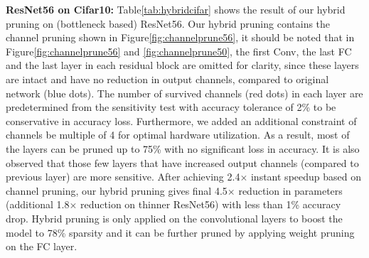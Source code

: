 \documentclass{article}
\begin{document}
\textbf{ResNet56 on Cifar10:} 
Table\ref{tab:hybridcifar} shows the result of our hybrid pruning on (bottleneck based) ResNet56. %
Our hybrid pruning contains the channel pruning shown in Figure\ref{fig:channelprune56}, it should be noted that in Figure\ref{fig:channelprune56} and \ref{fig:channelprune50}, the first Conv, the last FC and the last layer in each residual block are omitted for clarity, since these layers are intact and have no reduction in output channels, compared to original network (blue dots). The number of survived channels (red dots) in each layer are predetermined from the sensitivity test with accuracy tolerance of 2\% to be conservative in accuracy loss. Furthermore, we added an additional constraint of channels be multiple of 4 for optimal hardware utilization. %
As a result, most of the layers can be pruned up to 75\% with no significant loss in accuracy. It is also observed that those few layers that have increased output channels (compared to previous layer) are more sensitive. 
After achieving 2.4$\times$ instant speedup based on channel pruning, our hybrid pruning gives final 4.5$\times$ reduction in parameters (additional 1.8$\times$ reduction on thinner ResNet56) with less than 1\% accuracy drop. Hybrid pruning is only applied on the convolutional layers to boost the model to 78\% sparsity and it can be further pruned by applying weight pruning on the FC layer.  




\end{document}
